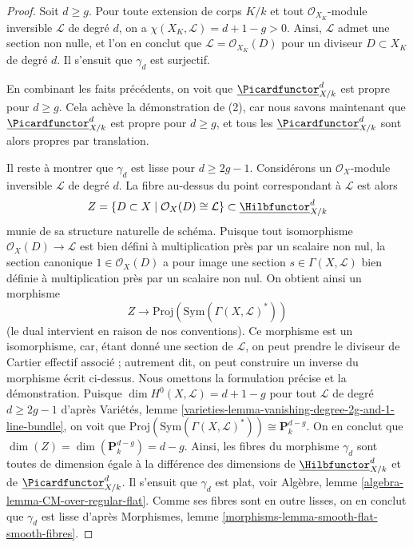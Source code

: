 \begin{proof}
\medskip\noindent
Soit $d \geq g$. Pour toute extension de corps $K/k$ et tout
$\mathcal{O}_{X_K}$-module inversible $\mathcal{L}$ de degré $d$, on a
$\chi(X_K, \mathcal{L}) = d + 1 - g > 0$. Ainsi, $\mathcal{L}$ admet une
section non nulle, et l'on en conclut que $\mathcal{L} = \mathcal{O}_{X_K}(D)$
pour un diviseur $D \subset X_K$ de degré $d$. Il s'ensuit que
$\gamma_d$ est surjectif.

\medskip\noindent
En combinant les faits précédents, on voit que
$\underline{\Picardfunctor}^d_{X/k}$ est propre pour $d \geq g$.
Cela achève la démonstration de (2), car nous savons maintenant que
$\underline{\Picardfunctor}^d_{X/k}$ est propre pour $d \geq g$, et
tous les $\underline{\Picardfunctor}^d_{X/k}$ sont alors propres par translation.

\medskip\noindent
Il reste à montrer que $\gamma_d$ est lisse pour $d \geq 2g - 1$.
Considérons un $\mathcal{O}_X$-module inversible $\mathcal{L}$ de degré
$d$. La fibre au-dessus du point correspondant à $\mathcal{L}$ est alors
$$
Z = \{D \subset X \mid \mathcal{O}_X(D) \cong \mathcal{L}\} \subset
\underline{\Hilbfunctor}^d_{X/k}
$$
munie de sa structure naturelle de schéma. Puisque tout isomorphisme
$\mathcal{O}_X(D) \to \mathcal{L}$ est bien défini à
multiplication près par un scalaire non nul, la section canonique
$1 \in \mathcal{O}_X(D)$ a pour image une section
$s \in \Gamma(X, \mathcal{L})$ bien définie à multiplication
près par un scalaire non nul. On obtient ainsi un morphisme
$$
Z \longrightarrow
\text{Proj}(\text{Sym}(\Gamma(X, \mathcal{L})^*))
$$
(le dual intervient en raison de nos conventions). Ce morphisme est un isomorphisme,
car, étant donné une section de $\mathcal{L}$, on peut prendre le diviseur de Cartier
effectif associé ; autrement dit, on peut construire un inverse du
morphisme écrit ci-dessus. Nous omettons la formulation précise et la démonstration.
Puisque $\dim H^0(X, \mathcal{L}) = d + 1 - g$ pour tout
$\mathcal{L}$ de degré $d \geq 2g - 1$ d'après
Variétés, lemme \ref{varieties-lemma-vanishing-degree-2g-and-1-line-bundle},
on voit que $\text{Proj}(\text{Sym}(\Gamma(X, \mathcal{L})^*))
\cong \mathbf{P}^{d - g}_k$.
On en conclut que $\dim(Z) = \dim(\mathbf{P}^{d - g}_k) = d - g$.
Ainsi, les fibres du morphisme $\gamma_d$ sont toutes
de dimension égale à la différence des dimensions de
$\underline{\Hilbfunctor}^d_{X/k}$ et de $\underline{\Picardfunctor}^d_{X/k}$.
Il s'ensuit que $\gamma_d$ est plat, voir
Algèbre, lemme \ref{algebra-lemma-CM-over-regular-flat}.
Comme ses fibres sont en outre lisses, on en conclut que $\gamma_d$
est lisse d'après Morphismes, lemme \ref{morphisms-lemma-smooth-flat-smooth-fibres}.
\end{proof}





